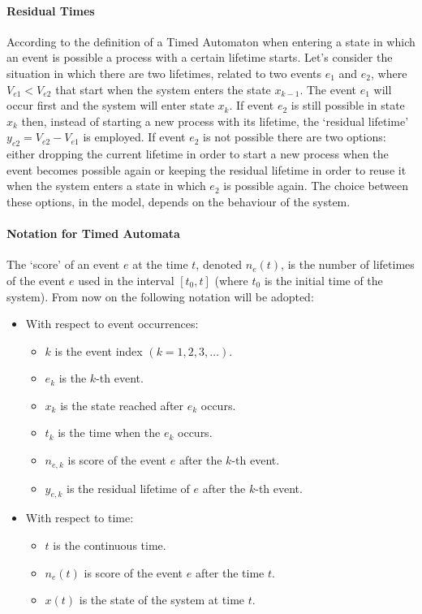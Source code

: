 \documentclass[12pt,a4paper]{article}
\begin{document}
\paragraph{Residual Times} According to the definition of a Timed Automaton when entering a state in which an event is possible a process with a certain lifetime starts. Let’s consider the situation in which there are two lifetimes, related to two events $e_1$ and $e_2$, where $V_{e1}<V_{e2}$ that start when the system enters the state $x_{k-1}$. The event $e_1$ will occur first and the system will enter state $x_k$. If event $e_2$ is still possible in state $x_k$ then, instead of starting a new process with its lifetime, the `residual lifetime’ $y_{e2}=V_{e2}-V_{e1}$ is employed. If event $e_2$ is not possible there are two options: either dropping the current lifetime in order to start a new process when the event becomes possible again or keeping the residual lifetime in order to reuse it when the system enters a state in which $e_2$ is possible again. The choice between these options, in the model, depends on the behaviour of the system.

\paragraph{Notation for Timed Automata}
The `score’ of an event $e$ at the time $t$, denoted $n_e (t)$, is the number of lifetimes of the event $e$ used in the interval $[t_0,t]$ (where $t_0$ is the initial time of the system). From now on the following notation will be adopted:
\begin{itemize}
\item With respect to event occurrences:
	\begin{itemize}
	\item $k$ is the event index $(k=1,2,3,\dots)$.
	\item $e_k$ is the $k$-th event.
	\item $x_k$ is the state reached after $e_k$ occurs.
	\item $t_k$ is the time when the $e_k$ occurs.
	\item $n_{e,k}$ is score of the event $e$ after the $k$-th event.
	\item $y_{e,k}$ is the residual lifetime of $e$ after the $k$-th event.
	\end{itemize} 
\item With respect to time:
	\begin{itemize}
	\item $t$ is the continuous time.
	\item $n_{e}(t)$ is score of the event $e$ after the time $t$.
	\item $x(t)$ is the state of the system at time $t$.
	\end{itemize} 
\end{itemize}
\end{document}
